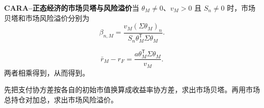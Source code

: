 \begin{tcolorbox}[knowledge]
\textbf{CARA--正态经济的市场贝塔与风险溢价}\quad 当 $\theta_M\ne0$、$v_M>0$ 且 $S_n\ne0$ 时，市场贝塔和市场风险溢价分别为
\begin{equation*}
 \beta_{n,M}=\frac{v_M(\Sigma\theta_M)_n}{S_n\theta_M^{\mathsf T}\Sigma\theta_M}.
 \tag{13.VI}\label{eq:wj-13-normal-market-beta}
\end{equation*}

\begin{equation*}
 \bar r_M-r_F=\frac{a\theta_M^{\mathsf T}\Sigma\theta_M}{v_M}.
 \tag{13.VII}\label{eq:wj-13-normal-market-premium}
\end{equation*}
两者相乘得到，从而得到。
\end{tcolorbox}

先把支付协方差按各自的初始市值换算成收益率协方差，求出市场贝塔。再用市场总持仓对加总，求出市场风险溢价。


